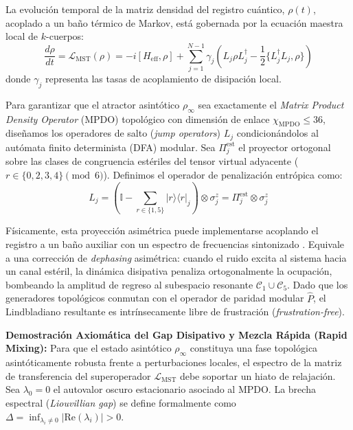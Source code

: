 \documentclass[12pt,a4paper]{article}
\theoremstyle{plain}
\theoremstyle{definition}
\theoremstyle{remark}
\begin{document}
La evolución temporal de la matriz densidad del registro cuántico, $\rho(t)$, acoplado a un baño térmico de Markov, está gobernada por la ecuación maestra local de $k$-cuerpos:
\begin{equation}
\frac{d\rho}{dt} = \mathcal{L}_{\text{MST}}(\rho) = -i[H_{\text{eff}}, \rho] + \sum_{j=1}^{N-1} \gamma_j \left( L_j \rho L_j^\dagger - \frac{1}{2} \{ L_j^\dagger L_j, \rho \} \right)
\label{eq:app_lindblad_master}
\end{equation}
donde $\gamma_j$ representa las tasas de acoplamiento de disipación local.

Para garantizar que el atractor asintótico $\rho_\infty$ sea exactamente el \textit{Matrix Product Density Operator} (MPDO) topológico con dimensión de enlace $\chi_{\text{MPDO}} \le 36$, diseñamos los operadores de salto (\textit{jump operators}) $L_j$ condicionándolos al autómata finito determinista (DFA) modular. Sea $\Pi_j^{\text{est}}$ el proyector ortogonal sobre las clases de congruencia estériles del tensor virtual adyacente ($r \in \{0,2,3,4\} \pmod 6$). Definimos el operador de penalización entrópica como:
\begin{equation}
L_j = \left( \mathbb{I} - \sum_{r \in \{1,5\}} |r\rangle\langle r|_j \right) \otimes \sigma_j^z = \Pi_j^{\text{est}} \otimes \sigma_j^z
\label{eq:app_jump_operators}
\end{equation}

Físicamente, esta proyección asimétrica puede implementarse acoplando el registro a un baño auxiliar con un espectro de frecuencias sintonizado \cite{Liu2025}. Equivale a una corrección de \textit{dephasing} asimétrica: cuando el ruido excita al sistema hacia un canal estéril, la dinámica disipativa penaliza ortogonalmente la ocupación, bombeando la amplitud de regreso al subespacio resonante $\mathcal{C}_1 \cup \mathcal{C}_5$. Dado que los generadores topológicos conmutan con el operador de paridad modular $\hat{P}$, el Lindbladiano resultante es intrínsecamente libre de frustración (\textit{frustration-free}).

\textbf{Demostración Axiomática del Gap Disipativo y Mezcla Rápida (Rapid Mixing):}
Para que el estado asintótico $\rho_\infty$ constituya una fase topológica asintóticamente robusta frente a perturbaciones locales, el espectro de la matriz de transferencia del superoperador $\mathcal{L}_{\text{MST}}$ debe soportar un hiato de relajación. Sea $\lambda_0 = 0$ el autovalor oscuro estacionario asociado al MPDO. La brecha espectral (\textit{Liouvillian gap}) se define formalmente como $\Delta = \inf_{\lambda_i \neq 0} |\text{Re}(\lambda_i)| > 0$.
\end{document}
